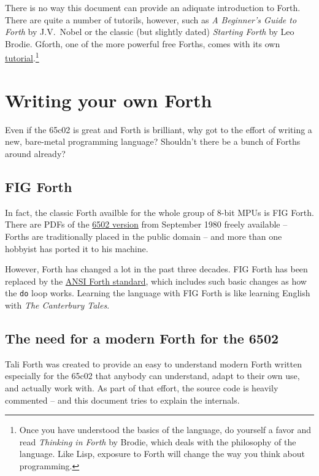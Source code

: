 There is no way this document can provide an adiquate introduction to Forth.
There are quite a number of tutorils, however, such as \textit{A Beginner's
Guide to Forth} by J.V.~Nobel\cite{nobel} or the classic (but slightly dated)
\textit{Starting Forth}\cite{brodie03} by Leo Brodie.
Gforth, one of the more powerful free Forths, comes with its own
\href{http://www.complang.tuwien.ac.at/forth/gforth/Docs-html/Tutorial.html}{tutorial}.\footnote{Once
you have understood the basics of the language, do yourself a favor and read
\textit{Thinking in Forth} by Brodie\cite{brodie84}, which
deals with the philosophy of the language. Like Lisp, exposure to
Forth will change the way you think about programming.} 


\section{Writing your own Forth}

Even if the 65c02 is great and Forth is brilliant, why got to the effort of
writing a new, bare-metal programming language? Shouldn't there be a bunch of
Forths around already?


\subsection{FIG Forth}

In fact, the classic Forth availble for the whole group of 8-bit MPUs is FIG
Forth. There are PDFs of the
\href{http://www.forth.org/fig-forth/fig-forth\_6502.pdf}{6502 version} from
September 1980 freely available -- Forths are traditionally placed in the public
domain -- and more than one hobbyist has ported it to his machine. 

However, Forth has changed a lot in the past three decades. FIG Forth has been
replaced by the \href{https://forth-standard.org/}{ANSI Forth
standard}, which includes such basic changes as how the
\texttt{do} loop works. Learning the language with FIG Forth is like learning
English with \textit{The Canterbury Tales}.


\subsection{The need for a modern Forth for the 6502}

Tali Forth was created to provide an easy to understand modern Forth written
especially for the 65c02 that anybody can understand, adapt to their own use,
and actually work with. As part of that effort, the source code is heavily
commented -- and this document tries to explain the internals.


